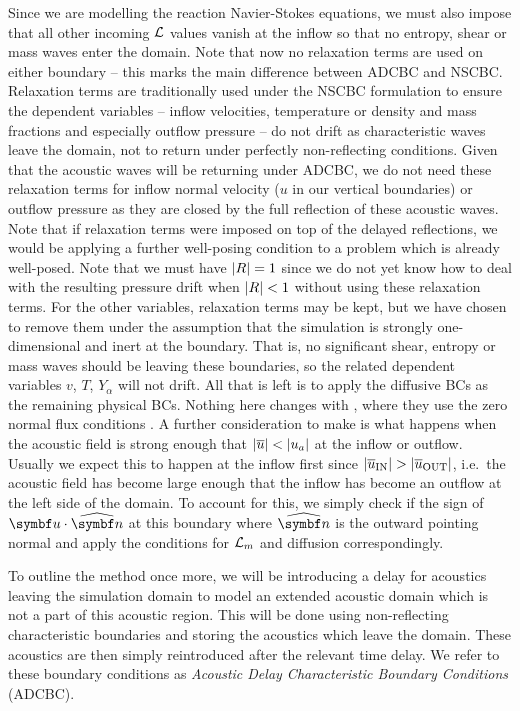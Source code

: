 Since we are modelling the reaction Navier-Stokes equations, we must also impose that all other incoming $\mathcal{L}$ values vanish at the inflow so that no entropy, shear or mass waves enter the domain. Note that now no relaxation terms are used on either boundary -- this marks the main difference between ADCBC and NSCBC. Relaxation terms are traditionally used under the NSCBC formulation to ensure the dependent variables -- inflow velocities, temperature or density and mass fractions and especially outflow pressure -- do not drift as characteristic waves leave the domain, not to return under perfectly non-reflecting conditions. Given that the acoustic waves will be returning under ADCBC, we do not need these relaxation terms for inflow normal velocity ($u$ in our vertical boundaries) or outflow pressure as they are closed by the full reflection of these acoustic waves. Note that if relaxation terms were imposed on top of the delayed reflections, we would be applying a further well-posing condition to a problem which is already well-posed. Note that we must have $\abs{R} = 1$ since we do not yet know how to deal with the resulting pressure drift when $\abs{R} < 1$ without using these relaxation terms. For the other variables, relaxation terms may be kept, but we have chosen to remove them under the assumption that the simulation is strongly one-dimensional and inert at the boundary. That is, no significant shear, entropy or mass waves should be leaving these boundaries, so the related dependent variables $v$, $T$, $Y_α$ will not drift. All that is left is to apply the diffusive BCs as the remaining physical BCs. Nothing here changes with \cite{sutherland2003ImprovedBoundaryConditions}, where they use the zero normal flux conditions . A further consideration to make is what happens when the acoustic field is strong enough that $\abs{\overline{u}} < \abs{u_a}$ at the inflow or outflow. Usually we expect this to happen at the inflow first since $\abs{\overline{u}_{\mathrm{IN}}} > \abs{\overline{u}_{\mathrm{OUT}}}$, i.e.\ the acoustic field has become large enough that the inflow has become an outflow at the left side of the domain. To account for this, we simply check if the sign of $\vb{u}\cdot\uvec{n}$ at this boundary where $\uvec{n}$ is the outward pointing normal and apply the conditions for $\mathcal{L}_m$ and diffusion correspondingly.

To outline the method once more, we will be introducing a delay for acoustics leaving the simulation domain to model an extended acoustic domain which is not a part of this acoustic region. This will be done using non-reflecting characteristic boundaries and storing the acoustics which leave the domain. These acoustics are then simply reintroduced after the relevant time delay. We refer to these boundary conditions as \emph{Acoustic Delay Characteristic Boundary Conditions} (ADCBC).

